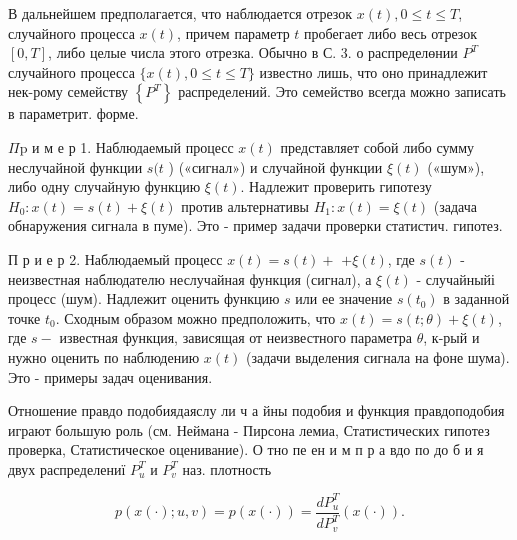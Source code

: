 \documentclass[10pt]{article}
\begin{document}
В дальнейшем предполагается, что наблюдается отрезок $x(t), 0 \leqslant t \leqslant T$, случайного процесса $x(t)$, причем параметр $t$ пробегает либо весь отрезок $[0, T]$, либо целые числа этого отрезка. Обычно в С. 3. о распределөнии $P^{T}$ случайного процесса $\{x(t), 0 \leqslant t \leqslant T\}$ известно лишь, что оно принадлежит нек-рому семейству $\left\{P^{T}\right\}$ распределений. Это семейство всегда можно записать в параметрит. форме.



$\Pi \mathrm{p}$ и м е р 1. Наблюдаемый процесс $x(t)$ представляет собой либо сумму неслучайной функции $s(t$ ) («сигнал») и случайной функции $\xi(t)$ («шум»), либо одну случайную функцию $\xi(t)$. Надлежит проверить гипотезу $H_{0}: x(t)=s(t)+\xi(t)$ против альтернативы $H_{1}: x(t)=\xi(t)$ (задача обнаружения сигнала в пуме). Это - пример задачи проверки статистич. гипотез.



П р и е р 2. Наблюдаемый процесс $x(t)=s(t)+$ $+\xi(t)$, где $s(t)$ - неизвестная наблюдателю неслучайная функция (сигнал), а $\xi(t)$ - случайныйі процесс (шум). Надлежит оценить функцию $s$ или ее значение $s\left(t_{0}\right)$ в заданной точке $t_{0}$. Сходным образом можно предположить, что $x(t)=s(t ; \theta)+\xi(t)$, где $s-$ известная функция, зависящая от неизвестного параметра $\theta$, к-рый и нужно оценить по наблюдению $x(t)$ (задачи выделения сигнала на фоне шума). Это - примеры задач оценивания.



Отношение правдо подобиядаяслу ли ч а йны подобия и функция правдоподобия играют большую роль (см. Неймана - Пирсона лемиа, Статистических гипотез проверка, Статистическое оценивание). О тно пе ен и м п р а вдо по до б и я двух распределениї $P_{u}^{T}$ и $P_{v}^{T}$ наз. плотность



\[

p(x(\cdot) ; u, v)=p(x(\cdot))=\frac{d P_{u}^{T}}{d P_{v}^{T}}(x(\cdot)) .

\]
\end{document}
